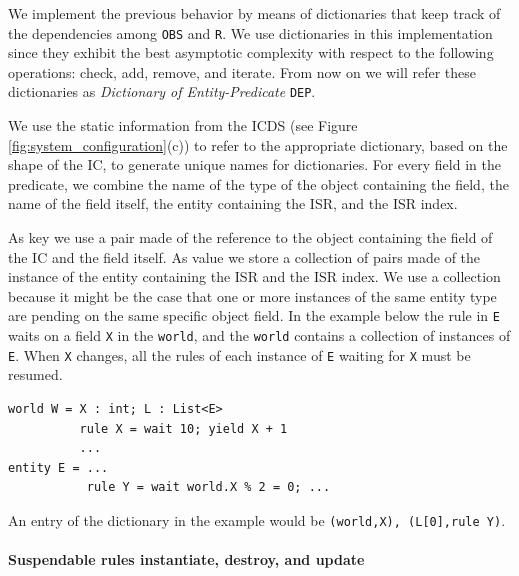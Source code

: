 \vspace{-0.056in}
We implement the previous behavior by means of dictionaries that keep track of the dependencies among \texttt{OBS} and \texttt{R}. We use dictionaries in this implementation since they exhibit the best asymptotic complexity with respect to the following operations: check, add, remove, and iterate. From now on we will refer these dictionaries as \emph{Dictionary of Entity-Predicate} \texttt{DEP}.

We use the static information from the ICDS (see Figure \ref{fig:system_configuration}(c)) to refer to the appropriate dictionary, based on the shape of the IC, to generate unique names for dictionaries. For every field in the predicate, we combine the name of the type of the object containing the field, the name of the field itself, the entity containing the ISR, and the ISR index.

As key we use a pair made of the reference to the object containing the field of the IC and the field itself. As value we store a collection of pairs made of the instance of the entity containing the ISR and the ISR index. We use a collection because it might be the case that one or more instances of the same entity type are pending on the same specific object field. In the example below the rule in \texttt{E} waits on a field \texttt{X} in the \texttt{world}, and the \texttt{world} contains a collection of instances of \texttt{E}. When \texttt{X} changes, all the rules of each instance of \texttt{E} waiting for \texttt{X} must be resumed.

\begin{lstlisting}
world W = X : int; L : List<E>
          rule X = wait 10; yield X + 1
          ...
entity E = ...
           rule Y = wait world.X % 2 = 0; ...
\end{lstlisting}

An entry of the dictionary in the example would be \texttt{(world,X), (L[0],rule Y)}.

\paragraph*{Suspendable rules instantiate, destroy, and update}

